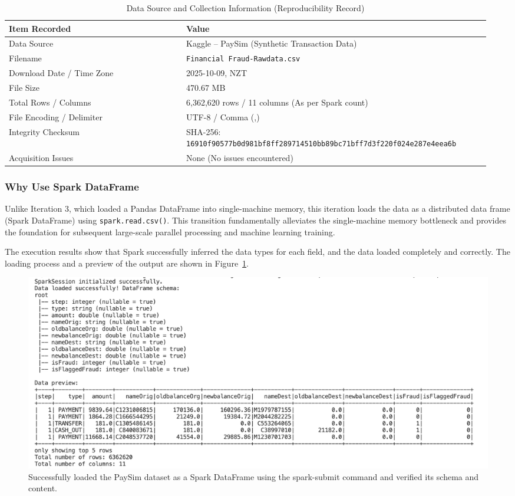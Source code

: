\documentclass[sigplan,screen]{acmart}
\begin{document}
\begin{table}[h]
\caption{Data Source and Collection Information (Reproducibility Record)}
\label{tab:data-source}
\begin{tabular}{|p{0.35\linewidth}|p{0.60\linewidth}|}
\hline
\textbf{Item Recorded} & \textbf{Value} \\
\hline
Data Source & Kaggle -- PaySim (Synthetic Transaction Data) \\
\hline
Filename & \texttt{Financial Fraud-Raw\-data.csv} \\
\hline
Download Date / Time Zone & 2025-10-09, NZT \\
\hline
File Size & 470.67 MB \\
\hline
Total Rows / Columns & 6,362,620 rows / 11 columns (As per Spark count) \\
\hline
File Encoding / Delimiter & UTF-8 / Comma (,) \\
\hline
Integrity Checksum & SHA-256: \texttt{\small 16910f90577b0d981bf8ff2897\allowbreak 14510bb89bc71bff7d3f220f024e\allowbreak 287e4eea6b} \\
\hline
Acquisition Issues & None (No issues encountered) \\
\hline
\end{tabular}
\end{table}

\subsubsection{Why Use Spark DataFrame}

Unlike Iteration 3, which loaded a Pandas DataFrame into single-machine memory, this iteration loads the data as a distributed data frame (Spark DataFrame) using \texttt{spark.\allowbreak read.\allowbreak csv()}.  This transition fundamentally alleviates the single-machine memory bottleneck and provides the foundation for subsequent large-scale parallel processing and machine learning training.

The execution results show that Spark successfully inferred the data types for each field, and the data loaded completely and correctly. The loading process and a preview of the output are shown in Figure~\ref{fig:spark-dataframe-load}.

\begin{figure}[h]
  \centering
  \includegraphics[width=\textwidth]{Figure/2.1.png}
  \caption{Successfully loaded the PaySim dataset as a Spark DataFrame using the spark-submit command and verified its schema and content.}
  \label{fig:spark-dataframe-load}
\end{figure}
\end{document}
